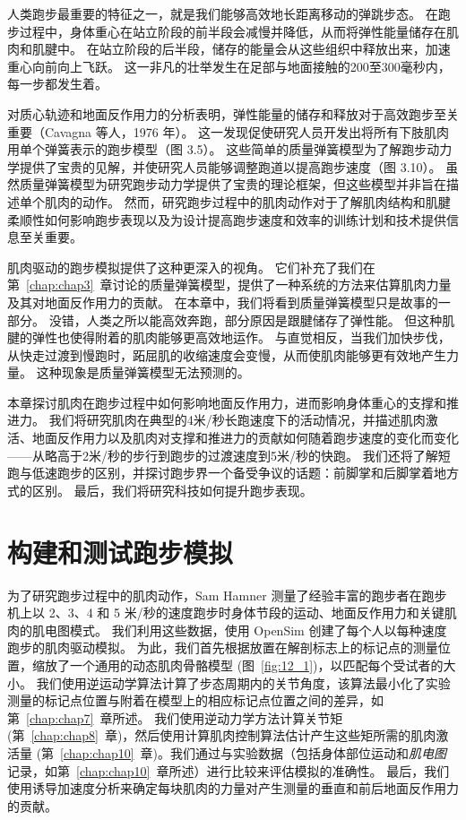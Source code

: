 人类跑步最重要的特征之一，就是我们能够高效地长距离移动的弹跳步态。
在跑步过程中，身体重心在站立阶段的前半段会减慢并降低，从而将弹性能量储存在肌肉和肌腱中。
在站立阶段的后半段，储存的能量会从这些组织中释放出来，加速重心向前向上飞跃。
这一非凡的壮举发生在足部与地面接触的200至300毫秒内，每一步都发生着。


对质心轨迹和地面反作用力的分析表明，弹性能量的储存和释放对于高效跑步至关重要（Cavagna 等人，1976 年）。
这一发现促使研究人员开发出将所有下肢肌肉用单个弹簧表示的跑步模型（图 3.5）。
这些简单的质量弹簧模型为了解跑步动力学提供了宝贵的见解，并使研究人员能够调整跑道以提高跑步速度（图 3.10）。
虽然质量弹簧模型为研究跑步动力学提供了宝贵的理论框架，但这些模型并非旨在描述单个肌肉的动作。
然而，研究跑步过程中的肌肉动作对于了解肌肉结构和肌腱柔顺性如何影响跑步表现以及为设计提高跑步速度和效率的训练计划和技术提供信息至关重要。


肌肉驱动的跑步模拟提供了这种更深入的视角。
它们补充了我们在第~\ref{chap:chap3}~章讨论的质量弹簧模型，提供了一种系统的方法来估算肌肉力量及其对地面反作用力的贡献。
在本章中，我们将看到质量弹簧模型只是故事的一部分。
没错，人类之所以能高效奔跑，部分原因是跟腱储存了弹性能。
但这种肌腱的弹性也使得附着的肌肉能够更高效地运作。
与直觉相反，当我们加快步伐，从快走过渡到慢跑时，跖屈肌的收缩速度会变慢，从而使肌肉能够更有效地产生力量。
这种现象是质量弹簧模型无法预测的。


本章探讨肌肉在跑步过程中如何影响地面反作用力，进而影响身体重心的支撑和推进力。
我们将研究肌肉在典型的4米/秒长跑速度下的活动情况，并描述肌肉激活、地面反作用力以及肌肉对支撑和推进力的贡献如何随着跑步速度的变化而变化——从略高于2米/秒的步行到跑步的过渡速度到5米/秒的快跑。
我们还将了解短跑与低速跑步的区别，并探讨跑步界一个备受争议的话题：前脚掌和后脚掌着地方式的区别。
最后，我们将研究科技如何提升跑步表现。


\section{构建和测试跑步模拟}

为了研究跑步过程中的肌肉动作，Sam Hamner 测量了经验丰富的跑步者在跑步机上以 2、3、4 和 5 米/秒的速度跑步时身体节段的运动、地面反作用力和关键肌肉的肌电图模式\cite{hamner2013muscle}。
我们利用这些数据，使用 OpenSim 创建了每个人以每种速度跑步的肌肉驱动模拟。
为此，我们首先根据放置在解剖标志上的标记点的测量位置，缩放了一个通用的动态肌肉骨骼模型 (图~\ref{fig:12_1})，以匹配每个受试者的大小。
我们使用逆运动学算法计算了步态周期内的关节角度，该算法最小化了实验测量的标记点位置与附着在模型上的相应标记点位置之间的差异，如第~\ref{chap:chap7}~章所述。
我们使用逆动力学方法计算关节矩 (第~\ref{chap:chap8}~章)，然后使用计算肌肉控制算法估计产生这些矩所需的肌肉激活量 (第~\ref{chap:chap10}~章)。我们通过与实验数据（包括身体部位运动和\textit{肌电图}记录，如第~\ref{chap:chap10}~章所述）进行比较来评估模拟的准确性。
最后，我们使用诱导加速度分析来确定每块肌肉的力量对产生测量的垂直和前后地面反作用力的贡献。


